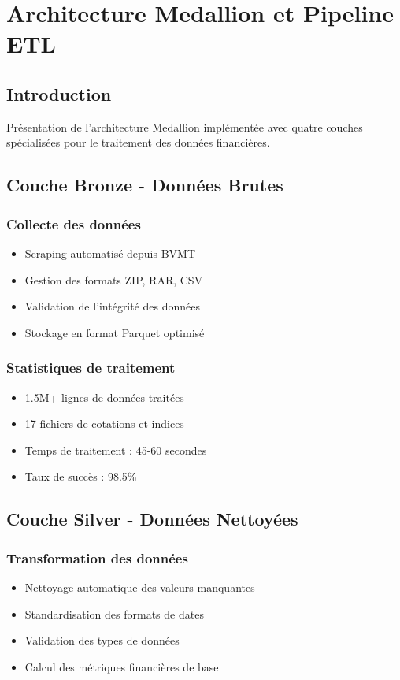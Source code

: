 \section{Architecture Medallion et Pipeline ETL}

\subsection{Introduction}
Présentation de l'architecture Medallion implémentée avec quatre couches spécialisées pour le traitement des données financières.

\subsection{Couche Bronze - Données Brutes}
\subsubsection{Collecte des données}
\begin{itemize}
    \item Scraping automatisé depuis BVMT
    \item Gestion des formats ZIP, RAR, CSV
    \item Validation de l'intégrité des données
    \item Stockage en format Parquet optimisé
\end{itemize}

\subsubsection{Statistiques de traitement}
\begin{itemize}
    \item 1.5M+ lignes de données traitées
    \item 17 fichiers de cotations et indices
    \item Temps de traitement : 45-60 secondes
    \item Taux de succès : 98.5\%
\end{itemize}

\subsection{Couche Silver - Données Nettoyées}
\subsubsection{Transformation des données}
\begin{itemize}
    \item Nettoyage automatique des valeurs manquantes
    \item Standardisation des formats de dates
    \item Validation des types de données
    \item Calcul des métriques financières de base
\end{itemize}

